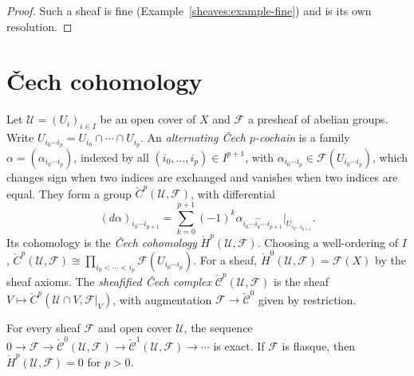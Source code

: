 \begin{proof}
Such a sheaf is fine (Example~\ref{sheaves:example-fine}) and is its own resolution.
\end{proof}

\section{\v{C}ech cohomology}\label{sheaves:section-cech}

\begin{definition}\label{sheaves:definition-cech}
Let $\mathcal{U} = (U_i)_{i \in I}$ be an open cover of $X$ and $\mathcal{F}$ a presheaf of abelian groups. Write $U_{i_0 \cdots i_p} = U_{i_0} \cap \cdots \cap U_{i_p}$. An \emph{alternating
\v{C}ech $p$-cochain} is a family $\alpha = (\alpha_{i_0 \cdots i_p})$, indexed by all $(i_0, \ldots, i_p) \in I^{p+1}$, with $\alpha_{i_0 \cdots i_p} \in \mathcal{F}(U_{i_0 \cdots i_p})$, which
changes sign when two indices are exchanged and vanishes when two indices are equal. They form a group $\check{C}^p(\mathcal{U}, \mathcal{F})$, with differential
\[
(d\alpha)_{i_0 \cdots i_{p+1}} = \sum_{k=0}^{p+1}(-1)^k\alpha_{i_0 \cdots \widehat{i_k} \cdots i_{p+1}}|_{U_{i_0 \cdots i_{p+1}}}.
\]
Its cohomology is the \emph{\v{C}ech cohomology} $\check{H}^p(\mathcal{U}, \mathcal{F})$. Choosing a well-ordering of $I$, $\check{C}^p(\mathcal{U}, \mathcal{F}) \cong \prod_{i_0 < \cdots < i_p}\mathcal{F}(U_{i_0 \cdots i_p})$.
For a sheaf, $\check{H}^0(\mathcal{U}, \mathcal{F}) = \mathcal{F}(X)$ by the sheaf axioms. The \emph{sheafified \v{C}ech complex} $\check{\mathcal{C}}^p(\mathcal{U}, \mathcal{F})$ is the sheaf
$V \mapsto \check{C}^p(\mathcal{U} \cap V, \mathcal{F}|_V)$, with augmentation $\mathcal{F} \to \check{\mathcal{C}}^0$ given by restriction.
\end{definition}

\begin{lemma}\label{sheaves:lemma-cech-resolution}
For every sheaf $\mathcal{F}$ and open cover $\mathcal{U}$, the sequence $0 \to \mathcal{F} \to \check{\mathcal{C}}^0(\mathcal{U}, \mathcal{F}) \to \check{\mathcal{C}}^1(\mathcal{U}, \mathcal{F}) \to \cdots$ is exact.
If $\mathcal{F}$ is flasque, then $\check{H}^p(\mathcal{U}, \mathcal{F}) = 0$ for $p > 0$.
\end{lemma}

